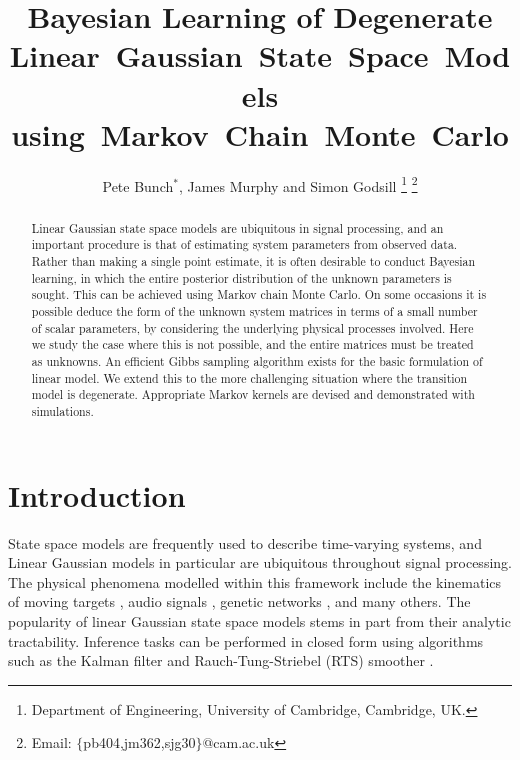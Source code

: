 \documentclass[journal,10pt]{IEEEtran}
\title{Bayesian Learning of Degenerate Linear~Gaussian~State~Space~Models using~Markov~Chain~Monte~Carlo}
\author{Pete Bunch$^*$, James Murphy and Simon Godsill
  \thanks{Department of Engineering, University of Cambridge, Cambridge, UK.}
  \thanks{Email: $\{$pb404,jm362,sjg30$\}$@cam.ac.uk}%
}
\begin{document}
\maketitle



\begin{abstract}
Linear Gaussian state space models are ubiquitous in signal processing, and an important procedure is that of estimating system parameters from observed data. Rather than making a single point estimate, it is often desirable to conduct Bayesian learning, in which the entire posterior distribution of the unknown parameters is sought. This can be achieved using Markov chain Monte Carlo. On some occasions it is possible deduce the form of the unknown system matrices in terms of a small number of scalar parameters, by considering the underlying physical processes involved. Here we study the case where this is not possible, and the entire matrices must be treated as unknowns. An efficient Gibbs sampling algorithm exists for the basic formulation of linear model. We extend this to the more challenging situation where the transition model is degenerate. Appropriate Markov kernels are devised and demonstrated with simulations.
\end{abstract}



\section{Introduction}

State space models are frequently used to describe time-varying systems, and Linear Gaussian models in particular are ubiquitous throughout signal processing. The physical phenomena modelled within this framework include the kinematics of moving targets \cite{Bar-Shalom2002}, audio signals \cite{Godsill1998}, genetic networks \cite{Beal2005}, and many others. The popularity of linear Gaussian state space models stems in part from their analytic tractability. Inference tasks can be performed in closed form using algorithms such as the Kalman filter \cite{Kalman1960} and Rauch-Tung-Striebel (RTS) smoother \cite{Rauch1965}.
\end{document}
